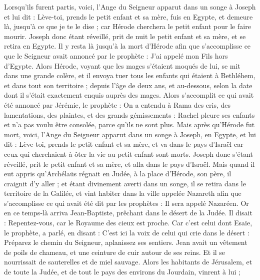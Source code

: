 \begin{multicols}{2}
Lorsqu'ils furent partis, voici, l'Ange du Seigneur apparut dans un songe à Joseph et lui dit : Lève-toi, prends le petit enfant et sa mère, fuis en Egypte, et demeure là, jusqu'à ce que je te le dise ; car Hérode cherchera le petit enfant pour le faire mourir.
Joseph donc étant réveillé, prit de nuit le petit enfant et sa mère, et se retira en Egypte.
Il y resta là jusqu'à la mort d'Hérode afin que s'accomplisse ce que le Seigneur avait annoncé par le prophète : J'ai appelé mon Fils hors d'Egypte.
Alors Hérode, voyant que les mages s'étaient moqués de lui, se mit dans une grande colère, et il envoya tuer tous les enfants qui étaient à Bethléhem, et dans tout son territoire ; depuis l'âge de deux ans, et au-dessous, selon la date dont il s'était exactement enquis auprès des mages.
Alors s'accomplit ce qui avait été annoncé par Jérémie, le prophète :
On a entendu à Rama des cris, des lamentations, des plaintes, et des grands gémissements : Rachel pleure ses enfants et n'a pas voulu être consolée, parce qu'ils ne sont plus.
Mais après qu'Hérode fut mort, voici, l'Ange du Seigneur apparut dans un songe à Joseph, en Egypte,
et lui dit : Lève-toi, prends le petit enfant et sa mère, et va dans le pays d'Israël car ceux qui cherchaient à ôter la vie au petit enfant sont morts.
Joseph donc s'étant réveillé, prit le petit enfant et sa mère, et alla dans le pays d'Israël.
Mais quand il eut appris qu'Archélaüs régnait en Judée, à la place d'Hérode, son père, il craignit d'y aller ; et étant divinement averti dans un songe, il se retira dans le territoire de la Galilée,
et vint habiter dans la ville appelée Nazareth afin que s'accomplisse ce qui avait été dit par les prophètes : Il sera appelé Nazaréen.
\VerseOne{}Or en ce temps-là arriva Jean-Baptiste, prêchant dans le désert de la Judée.
Il disait : Repentez-vous, car le Royaume des cieux est proche.
Car c'est celui dont Esaïe, le prophète, a parlé, en disant : C'est ici la voix de celui qui crie dans le désert : Préparez le chemin du Seigneur, aplanissez ses sentiers.
Jean avait un vêtement de poils de chameau, et une ceinture de cuir autour de ses reins. Et il se nourrissait de sauterelles et de miel sauvage.
Alors les habitants de Jérusalem, et de toute la Judée, et de tout le pays des environs du Jourdain, vinrent à lui ;

\end{multicols}
